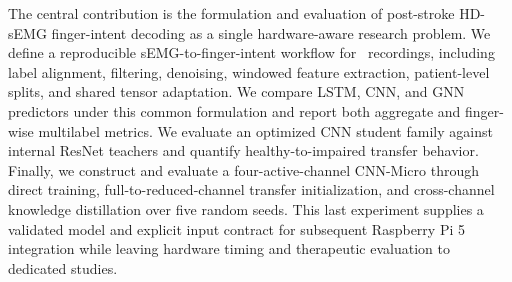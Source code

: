The central contribution is the formulation and evaluation of post-stroke HD-sEMG finger-intent decoding as a single hardware-aware research problem. We define a reproducible sEMG-to-finger-intent workflow for \physiomio\ recordings, including label alignment, filtering, denoising, windowed feature extraction, patient-level splits, and shared tensor adaptation. We compare LSTM, CNN, and GNN predictors under this common formulation and report both aggregate and finger-wise multilabel metrics. We evaluate an optimized CNN student family against internal ResNet teachers and quantify healthy-to-impaired transfer behavior. Finally, we construct and evaluate a four-active-channel CNN-Micro through direct training, full-to-reduced-channel transfer initialization, and cross-channel knowledge distillation over five random seeds. This last experiment supplies a validated model and explicit input contract for subsequent Raspberry Pi 5 integration while leaving hardware timing and therapeutic evaluation to dedicated studies.
